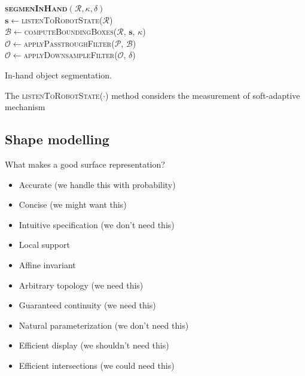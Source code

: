\begin{algorithm}[h]
\textbf{\textsc{segmenInHand}}$(\mathcal{R}, \kappa, \delta)$\\ %
\LinesNumbered
\DontPrintSemicolon
\SetAlgoVlined {} 
  $\mathbf{s} \leftarrow$\textsc{listenToRobotState}($\mathcal{R}$) \\
  $\mathcal{B} \leftarrow$\textsc{computeBoundingBoxes}($\mathcal{R}$, $\mathbf{s}$, $\kappa$) \\
  $\mathcal{O} \leftarrow$\textsc{applyPasstroughFilter}($\mathcal{P}$, $\mathcal{B}$) \\
  $\mathcal{O} \leftarrow$\textsc{applyDownsampleFilter}($\mathcal{O}$, $\delta$) \\
\caption{In-hand object segmentation.} \label{alg:in-hand-segmentation}
\end{algorithm}

The \textsc{listenToRobotState}($\cdot$) method considers the measurement of soft-adaptive mechanism

\subsection{Shape modelling}
\label{sec:shape}
What makes a good surface representation?
\begin{itemize}
\item Accurate (we handle this with probability)
\item Concise (we might want this)
\item Intuitive specification (we don't need this)
\item Local support
\item Affine invariant 
\item Arbitrary topology (we need this)
\item Guaranteed continuity (we need this)
\item Natural parameterization (we don't need this)
\item Efficient display (we shouldn't need this)
\item Efficient intersections (we could need this)
\end{itemize}

